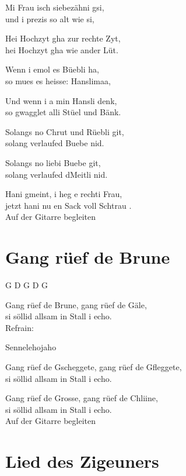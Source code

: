 \documentclass[
  letterpaper,
  a5paper]{memoir}
\begin{document}
Mi Frau isch siebezähni gsi,\\
und i prezis so alt wie si,

Hei Hochzyt gha zur rechte Zyt,\\
hei Hochzyt gha wie ander Lüt.

Wenn i emol es Büebli ha,\\
so mues es heisse: Hanslimaa,

Und wenn i a min Hansli denk,\\
so gwagglet alli Stüel und Bänk.

Solangs no Chrut und Rüebli git,\\
solang verlaufed Buebe nid.

Solangs no liebi Buebe git,\\
solang verlaufed d\textquotesingle Meitli nid.

Hani gmeint, i heg e rechti Frau,\\
jetzt hani nu en Sack voll Schtrau .\\
Auf der Gitarre begleiten

\hypertarget{gang-ruxfcef-de-brune}{%
\chapter{Gang rüef de Brune}\label{gang-ruxfcef-de-brune}}

G D G D G

Gang rüef de Brune, gang rüef de Gäle,\\
si söllid allsam in Stall i echo.\\
Refrain:

Sennelehojaho

Gang rüef de Gscheggete, gang rüef de Gfleggete,\\
si söllid allsam in Stall i echo.

Gang rüef de Grosse, gang rüef de Chliine,\\
si söllid allsam in Stall i echo.\\
Auf der Gitarre begleiten

\hypertarget{lied-des-zigeuners}{%
\chapter{Lied des Zigeuners}\label{lied-des-zigeuners}}
\end{document}
